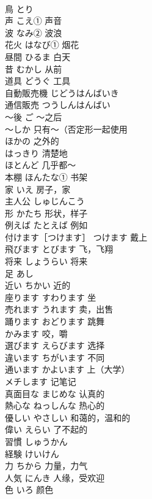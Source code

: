 \documentclass[8pt]{extreport}
\begin{document}
\begin{CJK}{UTF8}{min}
\\	鳥	とり	
\\	声	こえ① 声音	
\\	波	なみ② 波浪	
\\	花火	はなび① 烟花	
\\	昼間	ひるま 白天	
\\	昔	むかし 从前	
\\	道具	どうぐ 工具	
\\	自動販売機	じどうはんばいき	
\\	通信販売	つうしんはんばい	
\\	〜後	ご ～之后	
\\	〜しか	只有～（否定形一起使用	
\\	ほかの	之外的	
\\	はっきり	清楚地	
\\	ほとんど	几乎都～	
\\	本棚	ほんたな① 书架	
\\	家	いえ 房子，家	
\\	主人公	しゅじんこう	
\\	形	かたち 形状，样子	
\\	例えば	たとえば 例如	
\\	付けます［つけます］	つけます 戴上	
\\	飛びます	とびます 飞，飞翔	
\\	将来	しょうらい 将来	
\\	足	あし	
\\	近い	ちかい 近的	
\\	座ります	すわります 坐	
\\	売れます	うれます 卖，出售	
\\	踊ります	おどります 跳舞	
\\	かみます	咬，嚼	
\\	選びます	えらびます 选择	
\\	違います	ちがいます 不同	
\\	通います	かよいます 上（大学）	
\\	メチします	记笔记	
\\	真面目な	まじめな 认真的	
\\	熱心な	ねっしんな 热心的	
\\	優しい	やさしい 和蔼的，温和的	
\\	偉い	えらい 了不起的	
\\	習慣	しゅうかん	
\\	経験	けいけん	
\\	力	ちから 力量，力气	
\\	人気	にんき 人缘，受欢迎	
\\	色	いろ 颜色	

\end{CJK}
\end{document}

